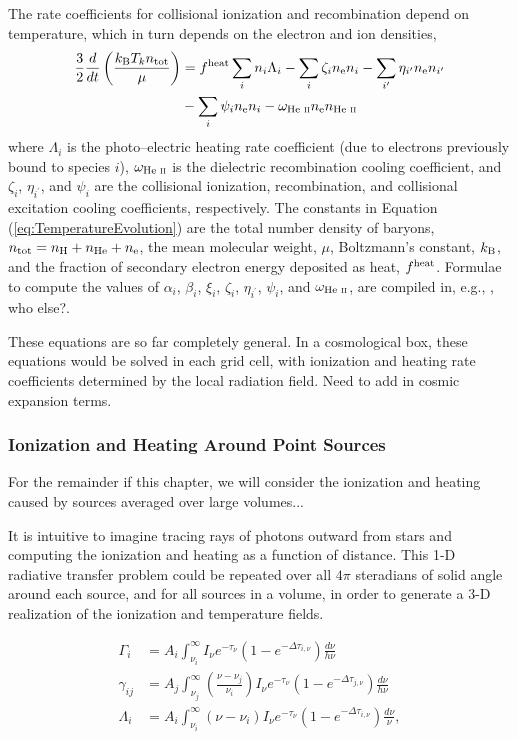 The rate coefficients for collisional ionization and recombination depend on temperature, which in turn depends on the electron and ion densities, 
\begin{align}
    \frac{3}{2}\frac{d}{dt}\left(\frac{k_{\text{B}} T_k n_{\text{tot}}}{\mu}\right) & = f^{\text{heat}}  \sum_i n_i \Lambda_i - \sum_i \zeta_i n_{\text{e}} n_i - \sum_{i^{\prime}} \eta_{i^{\prime}} n_{\text{e}} n_{i^{\prime}} \nonumber \\ & - \sum_i \psi_i n_{\text{e}} n_i - \omega_{\text{He } \textsc{ii}} n_{\text{e}} n_{\text{He } \textsc{ii}} \label{eq:TemperatureEvolution} 
\end{align}
where $\Lambda_i$ is the photo--electric heating rate coefficient (due to
electrons previously bound to species $i$), $\omega_{\text{He } \textsc{ii}}$ is the dielectric
recombination cooling coefficient, and $\zeta_i$, $\eta_{i^{\prime}}$, and
$\psi_i$ are the collisional ionization, recombination, and collisional
excitation cooling coefficients, respectively. The constants in Equation
(\ref{eq:TemperatureEvolution}) are the total number density of baryons,
$n_{\text{tot}} = n_\mathrm{H} + n_{\mathrm{He}} + n_{\text{e}}$, the mean molecular weight,
$\mu$, Boltzmann's constant, $k_{\text{B}}$, and the fraction of secondary electron
energy deposited as heat, $f^{\text{heat}}$. Formulae to compute the values of $\alpha_i$, $\beta_i$, $\xi_i$,
$\zeta_i$, $\eta_{i^{\prime}}$, $\psi_i$, and $\omega_{\text{He } \textsc{ii}}$, are compiled in, e.g., \cite{Fukugita1994}, {\color{red} who else?}.

These equations are so far completely general. In a cosmological box, these equations would be solved in each grid cell, with ionization and heating rate coefficients determined by the local radiation field. {\color{red} Need to add in cosmic expansion terms.}

\subsubsection{Ionization and Heating Around Point Sources} \label{sec:smallscales}
For the remainder if this chapter, we will consider the ionization and heating caused by sources averaged over large volumes...

It is intuitive to imagine tracing rays of photons outward from stars and computing the ionization and heating as a function of distance. This 1-D radiative transfer problem could be repeated over all $4\pi$ steradians of solid angle around each source, and for all sources in a volume, in order to generate a 3-D realization of the ionization and temperature fields. 

\begin{align}
    \Gamma_i & = A_i \int_{\nu_i}^{\infty} I_{\nu} e^{-\tau_{\nu}} \left(1 - e^{-\Delta \tau_{i,\nu}}\right) \frac{d\nu}{h\nu} \label{eq:PhotoIonizationRate} \\
    \gamma_{ij} & = A_j \int_{\nu_j}^{\infty} \left(\frac{\nu - \nu_j}{\nu_i}\right) I_{\nu} e^{-\tau_{\nu}} \left(1 - e^{-\Delta \tau_{j,\nu}}\right) \frac{d\nu}{h\nu} \label{eq:SecondaryIonizationRate} \\
    \Lambda_i & = A_i \int_{\nu_i}^{\infty} (\nu - \nu_i) I_{\nu} e^{-\tau_{\nu}} \left(1 - e^{-\Delta \tau_{i,\nu}}\right) \frac{d\nu}{\nu} , \label{eq:HeatingRate}
\end{align}

